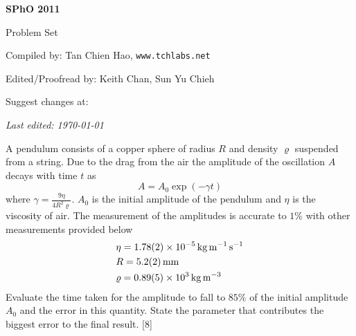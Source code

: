 \def\sphoyear{2011}
\setcounter{section}{0}
\fancyhead[L]{\textbf{SPhO \sphoyear}} 


\begin{titlepage}
\centering

{\Huge\bfseries SPhO \sphoyear}

\vspace{1cm}

{\LARGE Problem Set}

\vspace{2cm}

{\Large Compiled by: Tan Chien Hao, \texttt{www.tchlabs.net}}

\vspace{2cm}

{\Large Edited/Proofread by: Keith Chan, Sun Yu Chieh}

\vspace{2cm}

{\large Suggest changes at: \github}


\vfill

{\itshape Last edited: \today}
\end{titlepage}

\begin{problem}
    A pendulum consists of a copper sphere of radius $R$ and density $\varrho$ suspended from a string. Due to the drag from the air the amplitude of the oscillation $A$ decays with time $t$ as
    \[A=A_0 \exp(-\gamma t)\]
    where $\gamma=\frac{9 \eta}{4 R^{2} \varrho}$. $A_0$ is the initial amplitude of the pendulum and $\eta$ is the viscosity of air. The measurement of the amplitudes is accurate to $1\%$ with other measurements provided below
    \begin{align*}
        &\eta=\qty{1.78\pm 0.02e-5}{\kg\per\m\per\s}\\
	    &R=\qty{5.2\pm 0.2}{\mm} \\
	    &\varrho=\qty{0.89\pm 0.05e3}{\kg\per\m\cubed}
    \end{align*}
    Evaluate the time taken for the amplitude to fall to $85\%$ of the initial amplitude $A_{0}$ and the error in this quantity. State the parameter that contributes the biggest error to the final result.
\hfill{[8]}\end{problem}

